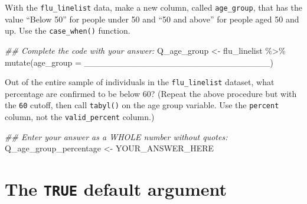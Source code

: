 \documentclass[
  letterpaper,
  DIV=11,
  numbers=noendperiod]{scrreprt}
\newenvironment{Shaded}{\begin{snugshade}}{\end{snugshade}}
\newcommand{\AttributeTok}[1]{\textcolor[rgb]{0.40,0.45,0.13}{#1}}
\newcommand{\DocumentationTok}[1]{\textcolor[rgb]{0.37,0.37,0.37}{\textit{#1}}}
\newcommand{\FunctionTok}[1]{\textcolor[rgb]{0.28,0.35,0.67}{#1}}
\newcommand{\NormalTok}[1]{\textcolor[rgb]{0.00,0.23,0.31}{#1}}
\newcommand{\OtherTok}[1]{\textcolor[rgb]{0.00,0.23,0.31}{#1}}
\newcommand{\SpecialCharTok}[1]{\textcolor[rgb]{0.37,0.37,0.37}{#1}}
\begin{document}
\begin{tcolorbox}[enhanced jigsaw, titlerule=0mm, colback=white, left=2mm, breakable, opacitybacktitle=0.6, colbacktitle=quarto-callout-tip-color!10!white, colframe=quarto-callout-tip-color-frame, bottomtitle=1mm, opacityback=0, coltitle=black, arc=.35mm, toptitle=1mm, title=\textcolor{quarto-callout-tip-color}{\faLightbulb}\hspace{0.5em}{Practice}, leftrule=.75mm, toprule=.15mm, bottomrule=.15mm, rightrule=.15mm]

With the \texttt{flu\_linelist} data, make a new column, called
\texttt{age\_group}, that has the value ``Below 50'' for people under 50
and ``50 and above'' for people aged 50 and up. Use the
\texttt{case\_when()} function.

\begin{Shaded}
\begin{Highlighting}[]
\DocumentationTok{\#\# Complete the code with your answer:}
\NormalTok{Q\_age\_group }\OtherTok{\textless{}{-}} 
\NormalTok{  flu\_linelist }\SpecialCharTok{\%\textgreater{}\%} 
  \FunctionTok{mutate}\NormalTok{(}\AttributeTok{age\_group =}\NormalTok{ \_\_\_\_\_\_\_\_\_\_\_\_\_\_\_\_\_\_\_\_\_\_\_\_\_\_\_\_\_\_)}
\end{Highlighting}
\end{Shaded}

Out of the entire sample of individuals in the \texttt{flu\_linelist}
dataset, what percentage are confirmed to be below 60? (Repeat the above
procedure but with the \texttt{60} cutoff, then call \texttt{tabyl()} on
the age group variable. Use the \texttt{percent} column, not the
\texttt{valid\_percent} column.)

\begin{Shaded}
\begin{Highlighting}[]
\DocumentationTok{\#\# Enter your answer as a WHOLE number without quotes:}
\NormalTok{Q\_age\_group\_percentage }\OtherTok{\textless{}{-}}\NormalTok{ YOUR\_ANSWER\_HERE}
\end{Highlighting}
\end{Shaded}

\end{tcolorbox}

\section{\texorpdfstring{The \texttt{TRUE} default
argument}{The TRUE default argument}}\label{the-true-default-argument}
\end{document}

